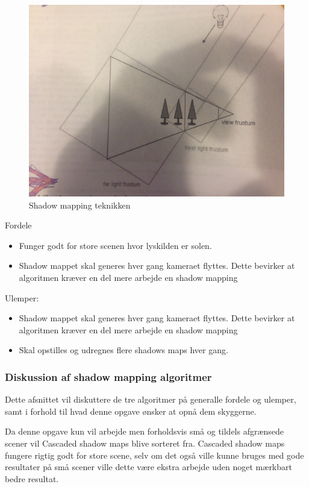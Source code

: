 \documentclass[11pt,a4paper]{article}
\begin{document}
\begin{figure}[ht!]
\centering
\includegraphics[width=140mm]{img/CSSHMAP1.JPG}
\caption{Shadow mapping teknikken}
\label{shadowmapdesc}
\end{figure}

Fordele
\begin{itemize}
  \item Funger godt for store scenen hvor lyskilden er solen.
  \item Shadow mappet skal generes hver gang kameraet flyttes. Dette bevirker at algoritmen kræver en del mere arbejde en shadow mapping
\end{itemize}

Ulemper:
\begin{itemize}
  \item Shadow mappet skal generes hver gang kameraet flyttes. Dette bevirker at algoritmen kræver en del mere arbejde en shadow mapping
  \item Skal opstilles og udregnes flere shadows maps hver gang.
\end{itemize}

\subsubsection{Diskussion af shadow mapping algoritmer}

Dette afsnittet vil diskuttere de tre algoritmer på generalle fordele og ulemper,  samt i forhold til hvad denne opgave ønsker at opnå dem skyggerne.

Da denne opgave kun vil arbejde men forholdsvis små og tildels afgrænsede scener vil Cascaded shadow maps blive sorteret fra. Cascaded shadow maps fungere rigtig godt for store scene, selv om det også ville kunne bruges med gode resultater på små scener ville dette være ekstra arbejde uden noget mærkbart bedre resultat. 
\end{document}
